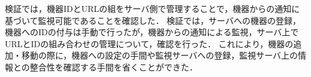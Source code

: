 検証では，機器IDとURLの組をサーバ側で管理することで，機器からの通知に基づいて監視可能であることを確認した．
検証では，サーバへの機器の登録，機器へのIDの付与は手動で行ったが，機器からの通知による監視，サーバ上でURLとIDの組み合わせの管理について，確認を行った．
これにより，機器の追加・移動の際に，機器への設定の手間や監視サーバへの登録，監視サーバ上の情報との整合性を確認する手間を省くことができた．


